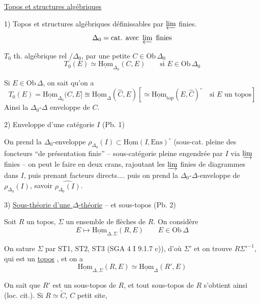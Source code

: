 
\uline{Topos et structures algébriques}


1) Topos et structures algébriques définissables par $\varprojlim$ finies.
\[
\Delta_0=\text{cat. avec }\varprojlim\text{ finies}
\]

$T_0$ th. algébrique rel /$\Delta_0$,  par une petite $C\in\mathrm{Ob}\,\Delta_0$\\
\[
T_0(E)\simeq\underline{\mathrm{Hom}}_{\Delta_0}(C,E)\qquad\text{si }E\in\mathrm{Ob}\,\Delta_0
\]

Si $E\in\mathrm{Ob}\,\Delta$, on sait qu'on a
\[
T_0(E)=\underline{\mathrm{Hom}}_{\Delta_0}(C,E]\approxeq\underline{\mathrm{Hom}}_\Delta(\widehat C,E)
\left[\simeq\underline{\mathrm{Hom}}_{\mathrm{top}}(E,\widehat C)^\circ\quad\text{si }E\text{ un topos}\right]
\]
Ainsi  la  $\Delta_0$-$\Delta$ enveloppe de $C$.

2) \inserted{$\Delta$-}Enveloppe d'une  catégorie $I$ (Pb. 1)

On prend la $\Delta_0$-enveloppe $\rho_{\Delta_0}(I)\subset\underline{\mathrm{Hom}}(I,\mathrm{Ens})^\circ$ (sous-cat. pleine des foncteurs ``de présentation finie'' -- sous-catégorie pleine engendrée par $I$ via $\varinjlim$ finies -- on peut le faire en deux crans, rajoutant les $\varinjlim$ finies de diagrammes dans $I$, puis prenant facteurs directs.... puis on prend la $\Delta_0$-$\Delta$-enveloppe de $\rho_{\Delta_0}(I)$, savoir $\widehat{\rho_{\Delta_0}(I)}$.

3) \uline{Sous-théorie d'une $\Delta$-théorie}  -- et sous-topos (Pb. 2)

Soit $R$ un topos, $\Sigma$ un ensemble de flèches de $R$. On considère
\[
E\longmapsto\underline{\mathrm{Hom}}_{\Delta,\Sigma}(R,E)\qquad E\in\mathrm{Ob}\,\Delta
\]

On sature $\Sigma$ par ST1, ST2, ST3 (SGA 4 I 9.1.7 c)), d'où $\Sigma'$ et on trouve $R\Sigma'^{-1}$, qui est un \uline{topos} , et on a
\[
\underline{\mathrm{Hom}}_{\Delta,\Sigma}(R,E)\simeq\underline{\mathrm{Hom}}_\Delta(R',E)
\]




On sait que $R'$ est un sous-topos de $R$, et tout sous-topos de $R$ s'obtient ainsi (loc. cit.). Si $R\simeq\widetilde C$, $C$ petit site,

